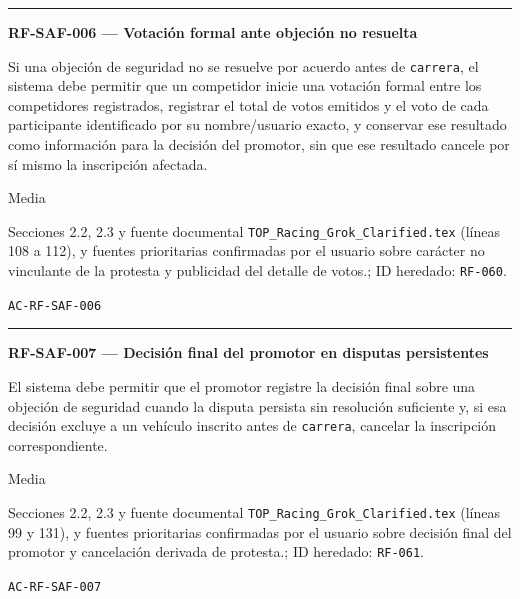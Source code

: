 \documentclass[10pt,letterpaper]{article}
\begin{document}
\vspace{0.25em}\hrule\vspace{0.65em}
\noindent\textbf{RF-SAF-006 --- Votación formal ante objeción no resuelta}\par
\begin{description}[style=nextline,leftmargin=3.15cm,labelwidth=2.8cm,font=\normalfont\bfseries]
\item[Obligación] Si una objeción de seguridad no se resuelve por acuerdo antes de \texttt{carrera}, el sistema debe permitir que un competidor inicie una votación formal entre los competidores registrados, registrar el total de votos emitidos y el voto de cada participante identificado por su nombre/usuario exacto, y conservar ese resultado como información para la decisión del promotor, sin que ese resultado cancele por sí mismo la inscripción afectada.
\item[Prioridad] Media
\item[Procedencia] Secciones 2.2, 2.3 y fuente documental \texttt{TOP\_Racing\_Grok\_Clarified.tex} (líneas 108 a 112), y fuentes prioritarias confirmadas por el usuario sobre carácter no vinculante de la protesta y publicidad del detalle de votos.; ID heredado: \texttt{RF-060}.
\item[Verificación] \texttt{AC-RF-SAF-006}
\end{description}
\vspace{0.25em}\hrule\vspace{0.65em}
\noindent\textbf{RF-SAF-007 --- Decisión final del promotor en disputas persistentes}\par
\begin{description}[style=nextline,leftmargin=3.15cm,labelwidth=2.8cm,font=\normalfont\bfseries]
\item[Obligación] El sistema debe permitir que el promotor registre la decisión final sobre una objeción de seguridad cuando la disputa persista sin resolución suficiente y, si esa decisión excluye a un vehículo inscrito antes de \texttt{carrera}, cancelar la inscripción correspondiente.
\item[Prioridad] Media
\item[Procedencia] Secciones 2.2, 2.3 y fuente documental \texttt{TOP\_Racing\_Grok\_Clarified.tex} (líneas 99 y 131), y fuentes prioritarias confirmadas por el usuario sobre decisión final del promotor y cancelación derivada de protesta.; ID heredado: \texttt{RF-061}.
\item[Verificación] \texttt{AC-RF-SAF-007}
\end{description}
\end{document}
